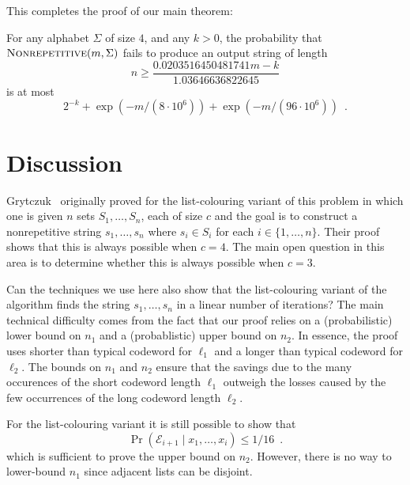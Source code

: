 \documentclass{patmorin}
\begin{document}
This completes the proof of our main theorem:

\begin{thm}
  For any alphabet $\Sigma$ of size $4$, and any $k>0$, the probability that $\textsc{Nonrepetitive}(m,\Sigma)$ fails to produce an output string of length 
  \[ n\ge \frac{0.0203516450481741m-k}{1.03646636822645} \] 
  is at most 
  \[ 2^{-k} + \exp(-m/(8\cdot 10^6)) + \exp(-m/(96\cdot 10^6)) \enspace . \]
\end{thm}

\section{Discussion}

Grytczuk \etal\ originally proved  for the list-colouring variant of this problem in which one is given $n$ sets $S_1,\ldots,S_n$, each of size $c$ and the goal is to construct a nonrepetitive string $s_1,\ldots,s_n$ where $s_i\in S_i$ for each $i\in\{1,\ldots,n\}$.  Their proof shows that this is always possible when $c=4$. The main open question in this area is to determine whether this is always possible when $c=3$.

Can the techniques we use here also show that the list-colouring variant of the algorithm finds the string $s_1,\ldots,s_n$ in a linear number of iterations?  The main technical difficulty comes from the fact that our proof relies on a (probabilistic) lower bound on $n_1$ and a (probablistic) upper bound on $n_2$.  In essence, the proof uses shorter than typical codeword for $\ell_1$ and a longer than typical codeword for $\ell_2$. The bounds on $n_1$ and $n_2$ ensure that the savings due to the many occurences of the short codeword length $\ell_1$ outweigh the losses caused by the few occurrences of the long codeword length $\ell_2$. 

For the list-colouring variant it is still possible to show that
\[
   \Pr(\mathcal{E}_{i+1}\mid x_1,\ldots,x_i) \le 1/16 \enspace .
\]
which is sufficient to prove the upper bound on $n_2$.  However, there is no way to lower-bound $n_1$ since adjacent lists can be disjoint.
\end{document}
